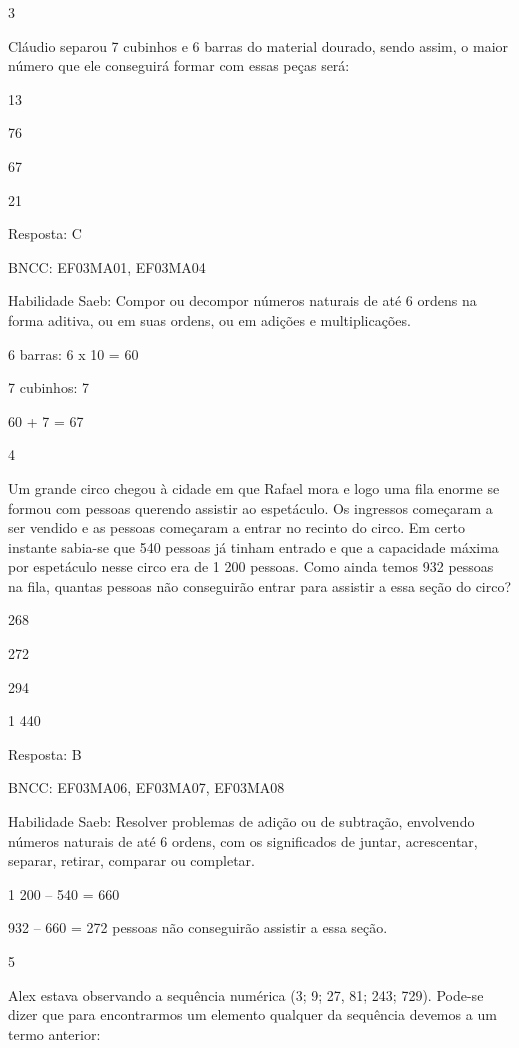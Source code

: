 \begin{escolha}
{\begin{escolha}
{\num{3}

Cláudio separou 7 cubinhos e 6 barras do material dourado, sendo assim,
o maior número que ele conseguirá formar com essas peças será:

\begin{escolha}
\item
  13
\item
  76
\item
  67
\item
  21
\end{escolha}

Resposta: C

BNCC: EF03MA01, EF03MA04

Habilidade Saeb: Compor ou decompor números naturais de até 6 ordens na
forma aditiva, ou em suas ordens, ou em adições e multiplicações.

6 barras: 6 x 10 = 60

7 cubinhos: 7

60 + 7 = 67

\num{4}

Um grande circo chegou à cidade em que Rafael mora e logo uma fila
enorme se formou com pessoas querendo assistir ao espetáculo. Os
ingressos começaram a ser vendido e as pessoas começaram a entrar no
recinto do circo. Em certo instante sabia-se que 540 pessoas já tinham
entrado e que a capacidade máxima por espetáculo nesse circo era de 1
200 pessoas. Como ainda temos 932 pessoas na fila, quantas pessoas não
conseguirão entrar para assistir a essa seção do circo?

\begin{escolha}
\item
  268
\item
  272
\item
  294
\item
  1 440
\end{escolha}

Resposta: B

BNCC: EF03MA06, EF03MA07, EF03MA08

Habilidade Saeb: Resolver problemas de adição ou de subtração,
envolvendo números naturais de até 6 ordens, com os significados de
juntar, acrescentar, separar, retirar, comparar ou completar.

1 200 -- 540 = 660

932 -- 660 = 272 pessoas não conseguirão assistir a essa seção.

\num{5}

Alex estava observando a sequência numérica (3; 9; 27, 81; 243; 729).
Pode-se dizer que para encontrarmos um elemento qualquer da sequência
devemos a um termo anterior:

}
\end{escolha}}
\end{escolha}
